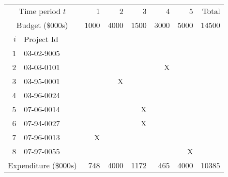 \begin{tabular}{rlrrrrrr}
\hline
\multicolumn{2}{c}{Time period $t$} & 1 & 2 & 3 & 4 & 5 & Total  \\
\multicolumn{2}{c}{Budget (\$000s)}  & 1000 & 4000 & 1500 & 3000 & 5000 & 14500\\
$i$ & Project Id  \\
\hline
1 & 03-02-9005 &      &         &         &         &      \\
2 & 03-03-0101 &      &         &         &    X    &      \\
3 & 03-95-0001 &      &    X    &         &         &      \\
4 & 03-96-0024 &      &         &         &         &      \\
5 & 07-06-0014 &      &         &    X    &         &      \\
6 & 07-94-0027 &      &         &    X    &         &      \\
7 & 07-96-0013 & X    &         &         &         &      \\
8 & 07-97-0055 &      &         &         &         &    X \\
\hline
\multicolumn{2}{c}{Expenditure (\$000s) } & 748 & 4000 & 1172 & 465 & 4000 & 10385 \\
\hline
\end{tabular}
